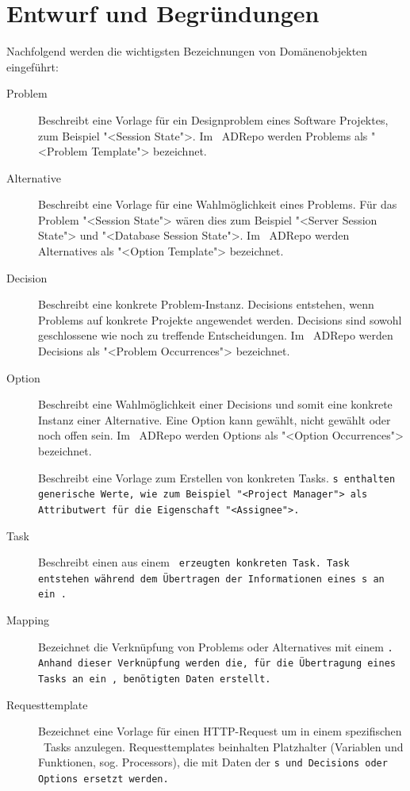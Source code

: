 	\section{Entwurf und Begründungen}
		Nachfolgend werden die wichtigsten Bezeichnungen von Domänenobjekten eingeführt:
		
		\begin{description}
			\item[Problem] Beschreibt eine Vorlage für ein Designproblem eines Software Projektes, 
				zum Beispiel "<Session State">. 
				Im \dks\ ADRepo werden Problems als "<Problem Template"> bezeichnet.
			\item[Alternative] Beschreibt eine Vorlage für eine Wahlmöglichkeit eines Problems.
				Für das Problem "<Session State"> wären dies zum Beispiel "<Server Session State"> und
				"<Database Session State">. 
				Im \dks\ ADRepo werden Alternatives als "<Option Template"> bezeichnet.
			\item[Decision] Beschreibt eine konkrete Problem-Instanz.
				Decisions entstehen, wenn Problems auf konkrete Projekte angewendet werden.
				Decisions sind sowohl geschlossene wie noch zu treffende Entscheidungen.
				Im \dks\ ADRepo werden Decisions als "<Problem Occurrences"> bezeichnet.
			\item[Option] Beschreibt eine Wahlmöglichkeit einer Decisions 
				und somit eine konkrete Instanz einer Alternative.
				Eine Option kann gewählt, nicht gewählt oder noch offen sein.
				Im \dks\ ADRepo werden Options als "<Option Occurrences"> bezeichnet.
			\item[\tt] Beschreibt eine Vorlage zum Erstellen von konkreten Tasks.
				\tt s enthalten generische Werte, wie zum Beispiel "<Project Manager"> als
				Attributwert für die Eigenschaft "<Assignee">.
			\item[Task] Beschreibt einen aus einem \tt\ erzeugten konkreten Task.
				Task entstehen während dem Übertragen der Informationen eines \tt s an ein \ppt.
			\item[Mapping] Bezeichnet die Verknüpfung von Problems oder Alternatives mit einem \tt. 
				Anhand dieser Verknüpfung werden die, für die Übertragung eines Tasks an ein \ppt, benötigten Daten erstellt.
			\item[Requesttemplate] Bezeichnet eine Vorlage für einen HTTP-Request um 
				in einem spezifischen \ppt\ Tasks anzulegen.
				Requesttemplates beinhalten Platzhalter (Variablen und Funktionen, sog. Processors),
				die mit Daten der \tt s und Decisions oder Options ersetzt werden. 
		\end{description}	
	
